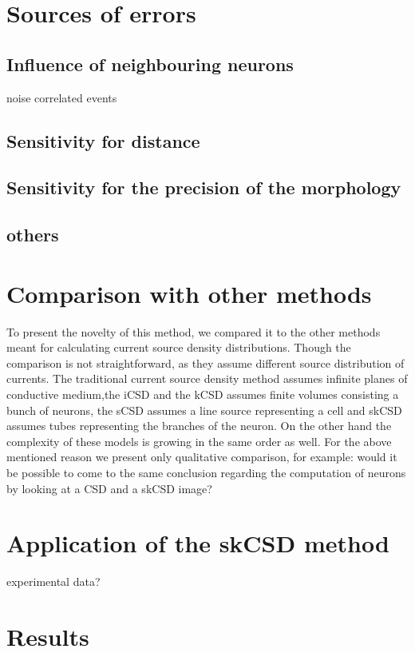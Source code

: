 \documentclass[12pt,a4paper]{article}
\begin{document}
\section{Sources of errors}
\subsection{Influence of neighbouring neurons }
noise
correlated events
\subsection{Sensitivity for distance }
\subsection{Sensitivity for the precision of the morphology}
\subsection{others}


\section{Comparison with other methods}
To present the novelty of this method, we compared it to the other methods meant for calculating current source density distributions. Though the comparison is not straightforward, as they assume different source distribution of currents. The traditional current source density method assumes infinite planes of conductive medium,the iCSD and the kCSD assumes finite volumes consisting a bunch of neurons, the sCSD assumes a line source representing a cell and skCSD assumes tubes representing the branches of the neuron. On the other hand the complexity of these models is growing in the same order as well.
For the above mentioned reason we present only qualitative comparison, for example: would it be possible to come to the same conclusion regarding the computation of neurons by looking at a CSD and a skCSD image?

\section{Application of the skCSD method}
experimental data?
\section{Results}
\end{document}
